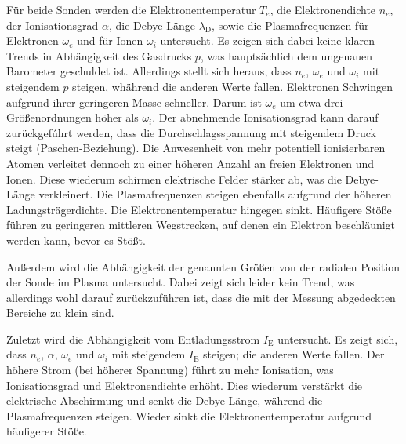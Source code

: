 F\"ur beide Sonden werden die Elektronentemperatur $T_e$, die Elektronendichte $n_e$, der Ionisationsgrad $\alpha$, die Debye-L\"ange $\lambda_\text{D}$, sowie die Plasmafrequenzen f\"ur Elektronen $\omega_e$ und f\"ur Ionen $\omega_i$ untersucht.
Es zeigen sich dabei keine klaren Trends in Abh\"angigkeit des Gasdrucks $p$, was haupts\"achlich dem ungenauen Barometer geschuldet ist.
Allerdings stellt sich heraus, dass $n_e$, $\omega_e$ und $\omega_i$ mit steigendem $p$ steigen, wh\"ahrend die anderen Werte fallen.
Elektronen Schwingen aufgrund ihrer geringeren Masse schneller.
Darum ist $\omega_e$ um etwa drei Gr\"o\ss enordnungen h\"oher als $\omega_i$.
Der abnehmende Ionisationsgrad kann darauf zur\"uckgef\'uhrt werden, dass die Durchschlagsspannung mit steigendem Druck steigt (Paschen-Beziehung).
Die Anwesenheit von mehr potentiell ionisierbaren Atomen verleitet dennoch zu einer h\"oheren Anzahl an freien Elektronen und Ionen.
Diese wiederum schirmen elektrische Felder st\"arker ab, was die Debye-L\"ange verkleinert.
Die Plasmafrequenzen steigen ebenfalls aufgrund der h\"oheren Ladungstr\"agerdichte.
Die Elektronentemperatur hingegen sinkt.
H\"aufigere St\"o\ss e f\"uhren zu geringeren mittleren Wegstrecken, auf denen ein Elektron beschl\"aunigt werden kann, bevor es St\"o\ss t.

Au\ss erdem wird die Abh\"angigkeit der genannten Gr\"o\ss en von der radialen Position der Sonde im Plasma untersucht.
Dabei zeigt sich leider kein Trend, was allerdings wohl darauf zur\"uckzuf\"uhren ist, dass die mit der Messung abgedeckten Bereiche zu klein sind.

Zuletzt wird die Abh\"angigkeit vom Entladungsstrom $I_\text{E}$ untersucht.
Es zeigt sich, dass $n_e$, $\alpha$, $\omega_e$ und $\omega_i$ mit steigendem $I_\text{E}$ steigen; die anderen Werte fallen.
Der h\"ohere Strom (bei h\"oherer Spannung) f\"uhrt zu mehr Ionisation, was Ionisationsgrad und Elektronendichte erh\"oht.
Dies wiederum verst\"arkt die elektrische Abschirmung und senkt die Debye-L\"ange, w\"ahrend die Plasmafrequenzen steigen.
Wieder sinkt die Elektronentemperatur aufgrund h\"aufigerer St\"o\ss e.